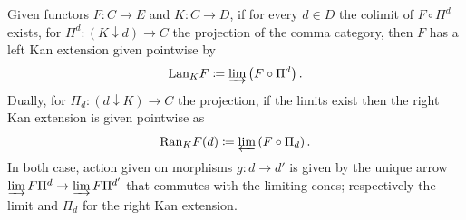 \begin{theorem}\label{thm:10.2}
	Given functors $F : C \to E$ and $K : C \to D$, if for every $d\in D$ the colimit of $F\circ \Pi^d$ exists, for $\Pi^d : (K\downarrow d) \to C$ the projection of the comma category, then $F$ has a left Kan extension given pointwise by
	\[
		\mathrm{Lan} _KF \coloneqq \varinjlim \left( F\circ \Pi^d \right) 
	.\]
	Dually, for $\Pi_d : (d\downarrow K) \to C$ the projection, if the limits exist then the right Kan extension is given pointwise as
	\[
		\mathrm{Ran} _KF(d)\coloneqq \varprojlim \left( F\circ \Pi_d \right) 
	.\]
	In both case, action given on morphisms $g : d \to d'$ is given by the unique arrow $\varinjlim F\Pi^d \to \varinjlim F\Pi^{d'} $ that commutes with the limiting cones; respectively the limit and $\Pi_d$ for the right Kan extension.
\end{theorem}

